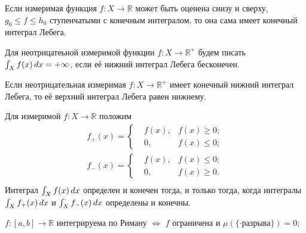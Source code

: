 \begin{to_lem}
    Если измеримая функция $f \colon X \to \mathbb{R}$ может быть оценена снизу и сверху, $g_0 \leq f \leq h_0$ ступенчатыми с конечным интегралом, то она сама имеет конечный интеграл Лебега.
    \label{5.62}
\end{to_lem}

\begin{to_def}
    Для неотрицатеьной измеримой функции $f \colon X \to \mathbb{R}^+$ будем писать $\int_X f(x) \, d x = + \infty$, если её нижний интеграл Лебега бесконечен.
\end{to_def}

\begin{to_lem}
    Если неотрицательная измеримая $f \colon X \to \mathbb{R}^+$ имеет конечный нижний интеграл Лебега, то её верхний интеграл Лебега равен нижнему.
    \label{5.65}
\end{to_lem}

\begin{to_thr}
    Для измеримой $f \colon X \to \mathbb{R}$ положим
    \begin{equation*}
    \begin{split}
        f_+(x) = \left\{
        \begin{aligned}
            &f(x), &f(x) \geq 0; \\
            &0, &f(x) \leq 0; 
        \end{aligned}
        \right. \\
        f_-(x) = \left\{
        \begin{aligned}
            &f(x), &f(x) \leq 0; \\
            &0, &f(x) \geq 0.
        \end{aligned}
        \right. \\
    \end{split}
    \end{equation*}
    Интеграл $\int_X f(x) \, d x$ определен и конечен тогда, и только тогда, когда интегралы $\int_X f_+ (x) \, d x$ и $\int_X f_- (x) \, d x$ определены и конечны.
    \label{5.66}
\end{to_thr}

\begin{to_thr}
    $f \colon [a,b] \to \mathbb{R}$ интегрируема по Риману $\Longleftrightarrow$ $f$ ограничена и $\mu(\{ \cdot \text{разрыва}\}) = 0$;
    \label{5.69}
\end{to_thr}